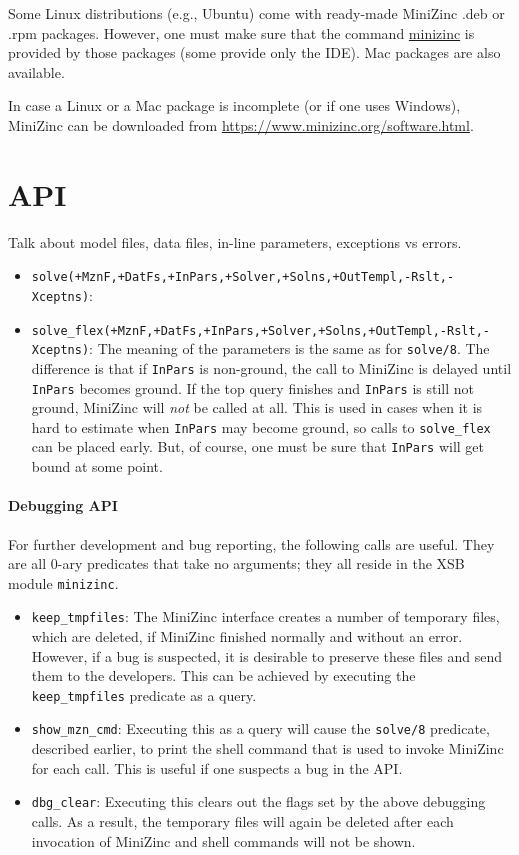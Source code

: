 Some Linux distributions (e.g., Ubuntu) come with ready-made MiniZinc .deb
or .rpm packages. However, one must make sure that the command
\url{minizinc} is provided by those packages (some provide only the IDE).
Mac packages are also available.

In case a Linux or a Mac package is incomplete (or if one uses Windows),
MiniZinc can be downloaded from
\url{https://www.minizinc.org/software.html}. 

\section{API}

Talk about model files, data files, in-line parameters, exceptions vs
errors.

\begin{itemize}
\item
  \texttt{solve(+MznF,+DatFs,+InPars,+Solver,+Solns,+OutTempl,-Rslt,-Xceptns)}: 
\item
  \texttt{solve\_flex(+MznF,+DatFs,+InPars,+Solver,+Solns,+OutTempl,-Rslt,-Xceptns)}: 
  The meaning of the parameters is the same as for \texttt{solve/8}.
  The difference is that if \texttt{InPars} is non-ground, the call to
  MiniZinc is delayed until \texttt{InPars} becomes ground. If the top
  query finishes and \texttt{InPars} is still not ground, MiniZinc will
  \emph{not} be called at all.
  This is used in cases when it is hard to estimate when \texttt{InPars}
  may become ground, so calls to \texttt{solve\_flex} can be placed
  early. But, of course, one must be sure that \texttt{InPars} will get
  bound at some point.  
\end{itemize}

\paragraph{Debugging API}
For further development and bug reporting, the following calls are useful.
They are all 0-ary predicates that take no arguments; they all reside in the
XSB module \texttt{minizinc}. 
\begin{itemize}
\item  \texttt{keep\_tmpfiles}: The MiniZinc interface creates a number of
  temporary files, which are deleted, if MiniZinc finished normally and
  without an error. However, if a bug is suspected, it is desirable to
  preserve these files and send them to the developers. 
  This can be achieved by executing the \texttt{keep\_tmpfiles} predicate
  as a query.
\item \texttt{show\_mzn\_cmd}: Executing this as a query will cause the
  \texttt{solve/8} predicate, described earlier, to print the shell command
  that is used to invoke MiniZinc for each call.
  This is useful if one suspects a bug in the API.
\item \texttt{dbg\_clear}: Executing this clears out the flags set by the
  above debugging calls. As a result, the temporary files will again be
  deleted after each invocation of MiniZinc and shell commands will not be
  shown.
\end{itemize}




